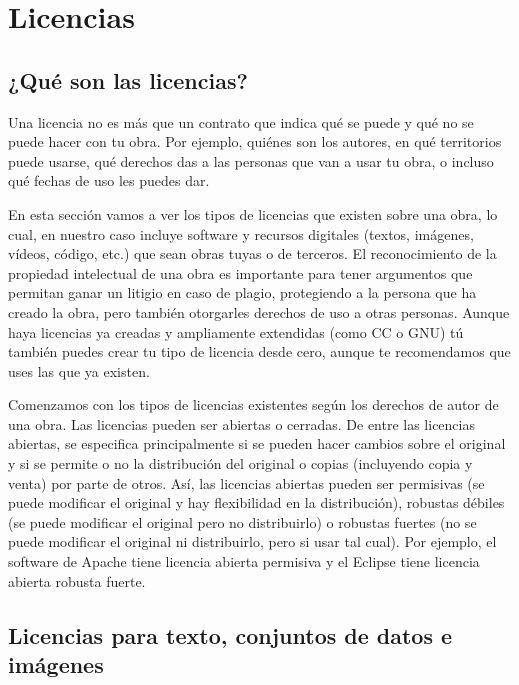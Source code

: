 \appendix
\chapter{Licencias}\label{anexo:licencias}

\section{¿Qué son las licencias?}

Una licencia no es más que un contrato que indica qué se puede y qué no se puede hacer con tu obra. Por ejemplo, quiénes son los autores, en qué territorios puede usarse, qué derechos das a las personas que van a usar tu obra, o incluso qué fechas de uso les puedes dar. 

En esta sección vamos a ver los tipos de licencias que existen sobre una obra, lo cual, en nuestro caso incluye software y recursos digitales (textos, imágenes, vídeos, código, etc.) que sean obras tuyas o de terceros. El reconocimiento de la propiedad intelectual de una obra es importante para tener argumentos que permitan ganar un litigio en caso de plagio, protegiendo a la persona que ha creado la obra, pero también otorgarles derechos de uso a otras personas. Aunque haya licencias ya creadas y ampliamente extendidas (como CC o GNU) tú también puedes crear tu tipo de licencia desde cero, aunque te recomendamos que uses las que ya existen.

Comenzamos con los tipos de licencias existentes según los derechos de autor de una obra. Las licencias pueden ser abiertas o cerradas. De entre las licencias abiertas, se especifica principalmente si se pueden hacer cambios sobre el original y si se permite o no la distribución del original o copias (incluyendo copia y venta) por parte de otros. Así, las licencias abiertas pueden ser permisivas (se puede modificar el original y hay flexibilidad en la distribución), robustas débiles (se puede modificar el original pero no distribuirlo) o robustas fuertes (no se puede modificar el original ni distribuirlo, pero si usar tal cual). Por ejemplo, el software de Apache tiene licencia abierta permisiva y el Eclipse tiene licencia abierta robusta fuerte.

\section{Licencias para texto, conjuntos de datos e imágenes}

